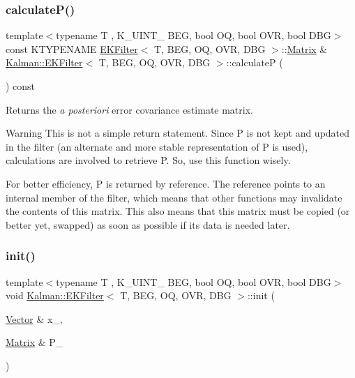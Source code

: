 \subsubsection{\texorpdfstring{calculate\+P()}{calculateP()}}
{\footnotesize\ttfamily template$<$typename T , K\+\_\+\+U\+I\+N\+T\+\_ B\+EG, bool OQ, bool O\+VR, bool D\+BG$>$ \\
const K\+T\+Y\+P\+E\+N\+A\+ME \mbox{\hyperlink{classKalman_1_1EKFilter}{E\+K\+Filter}}$<$ T, B\+EG, OQ, O\+VR, D\+BG $>$\+::\mbox{\hyperlink{classKalman_1_1EKFilter_a7cbc4cb4d9139a7f241b27110426af43}{Matrix}} \& \mbox{\hyperlink{classKalman_1_1EKFilter}{Kalman\+::\+E\+K\+Filter}}$<$ T, B\+EG, OQ, O\+VR, D\+BG $>$\+::calculateP (\begin{DoxyParamCaption}{ }\end{DoxyParamCaption}) const}



Returns the {\itshape a posteriori} error covariance estimate matrix. 

\begin{DoxyWarning}{Warning}
This is not a simple return statement. Since P is not kept and updated in the filter (an alternate and more stable representation of P is used), calculations are involved to retrieve P. So, use this function wisely. 

For better efficiency, P is returned by reference. The reference points to an internal member of the filter, which means that other functions may invalidate the contents of this matrix. This also means that this matrix must be copied (or better yet, swapped) as soon as possible if its data is needed later. 
\end{DoxyWarning}
\mbox{\label{classKalman_1_1EKFilter_a80d5dc8f46e8f5d4ec3a6b1e804fdc9f}} 
\subsubsection{\texorpdfstring{init()}{init()}}
{\footnotesize\ttfamily template$<$typename T , K\+\_\+\+U\+I\+N\+T\+\_ B\+EG, bool OQ, bool O\+VR, bool D\+BG$>$ \\
void \mbox{\hyperlink{classKalman_1_1EKFilter}{Kalman\+::\+E\+K\+Filter}}$<$ T, B\+EG, OQ, O\+VR, D\+BG $>$\+::init (\begin{DoxyParamCaption}\item[{\mbox{\hyperlink{classKalman_1_1EKFilter_af773d1217ecb01925b857d49b32bc636}{Vector}} \&}]{x\+\_\+,  }\item[{\mbox{\hyperlink{classKalman_1_1EKFilter_a7cbc4cb4d9139a7f241b27110426af43}{Matrix}} \&}]{P\+\_\+ }\end{DoxyParamCaption})}



